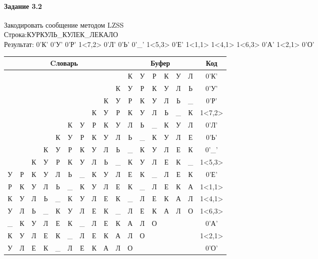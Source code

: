\documentclass[a4paper, 12pt]{article}
\begin{document}
\paragraph{Задание 3.2}

Закодировать сообщение методом LZSS\\
Строка:КУРКУЛЬ\_КУЛЕК\_ЛЕКАЛО\\
Результат: 0'К' 0'У' 0'Р' 1<7,2> 0'Л' 0'Ь' 0'\_' 1<5,3> 0'Е' 1<1,1> 1<4,1> 1<6,3> 0'А' 1<2,1> 0'О'\\
\begin{table}[h!]
\centering
\begin{tabular}{|c|c|c|c|c|c|c|c|c|c|c|c|c|c|c|c|c|}
\hline
\multicolumn{10}{|c|}{Cловарь} & \multicolumn{6}{c|}{Буфер} & Код  \\ \hline
  &   &   &   &   &   &   &   &   &   & К & У & Р & К & У & Л & 0'К'\\ \hline
  &   &   &   &   &   &   &   &   & К & У & Р & К & У & Л & Ь & 0'У'\\ \hline
  &   &   &   &   &   &   &   & К & У & Р & К & У & Л & Ь & \_ & 0'Р'\\ \hline
  &   &   &   &   &   &   & \cellcolor[HTML]{FFFF00} К & \cellcolor[HTML]{FFFF00} У & Р & \cellcolor[HTML]{FFFF00} К & \cellcolor[HTML]{FFFF00} У & Л & Ь & \_ & К & 1<7,2>\\ \hline
  &   &   &   &   & К & У & Р & К & У & Л & Ь & \_ & К & У & Л & 0'Л'\\ \hline
  &   &   &   & К & У & Р & К & У & Л & Ь & \_ & К & У & Л & Е & 0'Ь'\\ \hline
  &   &   & К & У & Р & К & У & Л & Ь & \_ & К & У & Л & Е & К & 0'\_'\\ \hline
  &   & К & У & Р & \cellcolor[HTML]{FFFF00} К & \cellcolor[HTML]{FFFF00} У & \cellcolor[HTML]{FFFF00} Л & Ь & \_ & \cellcolor[HTML]{FFFF00} К & \cellcolor[HTML]{FFFF00} У & \cellcolor[HTML]{FFFF00} Л & Е & К & \_ & 1<5,3>\\ \hline
У & Р & К & У & Л & Ь & \_ & К & У & Л & Е & К & \_ & Л & Е & К & 0'Е'\\ \hline
Р & \cellcolor[HTML]{FFFF00} К & У & Л & Ь & \_ & К & У & Л & Е & \cellcolor[HTML]{FFFF00} К & \_ & Л & Е & К & А & 1<1,1>\\ \hline
К & У & Л & Ь & \cellcolor[HTML]{FFFF00} \_ & К & У & Л & Е & К & \cellcolor[HTML]{FFFF00} \_ & Л & Е & К & А & Л & 1<4,1>\\ \hline
У & Л & Ь & \_ & К & У & \cellcolor[HTML]{FFFF00} Л & \cellcolor[HTML]{FFFF00} Е & \cellcolor[HTML]{FFFF00} К & \_ & \cellcolor[HTML]{FFFF00} Л & \cellcolor[HTML]{FFFF00} Е & \cellcolor[HTML]{FFFF00} К & А & Л & О & 1<6,3>\\ \hline
\_ & К & У & Л & Е & К & \_ & Л & Е & К & А & Л & О &   &   &   & 0'А'\\ \hline
К & У & \cellcolor[HTML]{FFFF00} Л & Е & К & \_ & Л & Е & К & А & \cellcolor[HTML]{FFFF00} Л & О &   &   &   &   & 1<2,1>\\ \hline
У & Л & Е & К & \_ & Л & Е & К & А & Л & О &   &   &   &   &   & 0'О'\\ \hline
\end{tabular}
\end{table}
\end{document}
